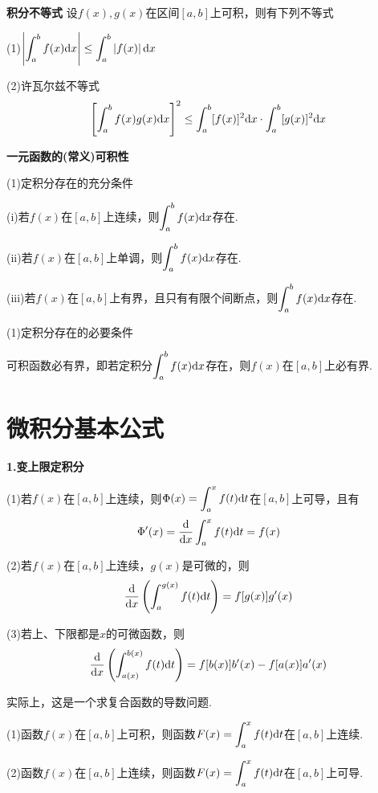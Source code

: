 \textbf{积分不等式} \quad 设$f(x),g(x)$在区间$[a,b]$上可积，则有下列不等式
\vspace{2mm}

(1)$\displaystyle\left|\int_a^b f(x)\mathrm{d} x\right|\leq \int_a^b\left|f(x)\right|\mathrm{d} x$
\vspace{2mm}

(2)许瓦尔兹不等式
\begin{equation}
    \left[\int_a^b f(x)g(x)\mathrm{d} x\right]^2\leq \int_a^b[f(x)]^2\mathrm{d} x\cdot\int_a^b[g(x)]^2\mathrm{d} x
    \nonumber
\end{equation}

\textbf{一元函数的(常义)可积性}

(1)定积分存在的充分条件

(i)若$f(x)$在$[a,b]$上连续，则$\displaystyle\int_a^b f(x)\mathrm{d} x$存在.

(ii)若$f(x)$在$[a,b]$上单调，则$\displaystyle\int_a^b f(x)\mathrm{d} x$存在.

(iii)若$f(x)$在$[a,b]$上有界，且只有有限个间断点，则$\displaystyle\int_a^b f(x)\mathrm{d} x$存在.

(1)定积分存在的必要条件

可积函数必有界，即若定积分$\displaystyle\int_a^b f(x)\mathrm{d} x$存在，则$f(x)$在$[a,b]$上必有界.

\section{微积分基本公式}
\textbf{1.变上限定积分}

(1)若$f(x)$在$[a,b]$上连续，则$\Phi(x)=\displaystyle\int_a^x f(t)\mathrm{d} t$在$[a,b]$上可导，且有
\begin{equation}
    \Phi'(x)=\dfrac{\mathrm{d}}{\mathrm{d} x}\int_a^x f(t)\mathrm{d} t=f(x)
    \nonumber
\end{equation}

(2)若$f(x)$在$[a,b]$上连续，$g(x)$是可微的，则
\begin{equation}
    \dfrac{\mathrm{d}}{\mathrm{d} x}\left(\int_a^{g(x)} f(t)\mathrm{d} t\right)=f[g(x)]g'(x)
    \nonumber
\end{equation}

(3)若上、下限都是$x$的可微函数，则
\begin{equation}
    \dfrac{\mathrm{d}}{\mathrm{d} x}\left(\int_{a(x)}^{b(x)} f(t)\mathrm{d} t\right)=f[b(x)]b'(x)-f[a(x)]a'(x)
    \nonumber
\end{equation}

实际上，这是一个求复合函数的导数问题.

\begin{property} \label{property:integral_with_variable_limit}

    (1)函数$f(x)$在$[a,b]$上可积，则函数$F(x)=\displaystyle\int_a^x f(t)\mathrm{d} t$在$[a,b]$上连续.

    (2)函数$f(x)$在$[a,b]$上连续，则函数$F(x)=\displaystyle\int_a^x f(t)\mathrm{d} t$在$[a,b]$上可导.
\end{property}

